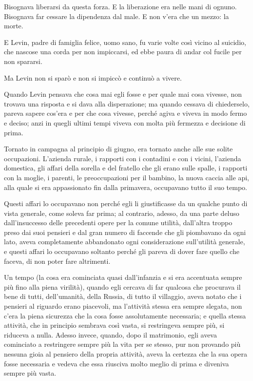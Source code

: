 Bisognava liberarsi da questa forza. E la liberazione era nelle mani di ognuno. Bisognava far cessare la dipendenza dal male. E non v'era che un mezzo: la morte. 

E Levin, padre di famiglia felice, uomo sano, fu varie volte così vicino al suicidio, che nascose una corda per non impiccarsi, ed ebbe paura di andar col fucile per non spararsi. 

Ma Levin non si sparò e non si impiccò e continuò a vivere. 

Quando Levin pensava che cosa mai egli fosse e per quale mai cosa vivesse, non trovava una risposta e si dava alla disperazione; ma quando cessava di chiederselo, pareva sapere cos'era e per che cosa vivesse, perché agiva e viveva in modo fermo e deciso; anzi in quegli ultimi tempi viveva con molta più fermezza e decisione di prima. 

Tornato in campagna al principio di giugno, era tornato anche alle sue solite occupazioni. L'azienda rurale, i rapporti con i contadini e con i vicini, l'azienda domestica, gli affari della sorella e del fratello che gli erano sulle spalle, i rapporti con la moglie, i parenti, le preoccupazioni per il bambino, la nuova caccia alle api, alla quale si era appassionato fin dalla primavera, occupavano tutto il suo tempo. 

Questi affari lo occupavano non perché egli li giustificasse da un qualche punto di vista generale, come soleva far prima; al contrario, adesso, da una parte deluso dall'insuccesso delle precedenti opere per la comune utilità, dall'altra troppo preso dai suoi pensieri e dal gran numero di faccende che gli piombavano da ogni lato, aveva completamente abbandonato ogni considerazione sull'utilità generale, e questi affari lo occupavano soltanto perché gli pareva di dover fare quello che faceva, di non poter fare altrimenti. 

Un tempo (la cosa era cominciata quasi dall'infanzia e si era accentuata sempre più fino alla piena virilità), quando egli cercava di far qualcosa che procurava il bene di tutti, dell'umanità, della Russia, di tutto il villaggio, aveva notato che i pensieri al riguardo erano piacevoli, ma l'attività stessa era sempre slegata, non c'era la piena sicurezza che la cosa fosse assolutamente necessaria; e quella stessa attività, che in principio sembrava così vasta, si restringeva sempre più, si riduceva a nulla. Adesso invece, quando, dopo il matrimonio, egli aveva cominciato a restringere sempre più la vita per se stesso, pur non provando più nessuna gioia al pensiero della propria attività, aveva la certezza che la sua opera fosse necessaria e vedeva che essa riusciva molto meglio di prima e diveniva sempre più vasta. 

